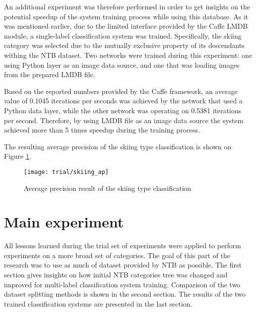     An additional experiment was therefore performed in order to get insights on the potential speedup of the system training process while using this database. As it was mentioned earlier, due to the limited interface provided by the Caffe LMDB module, a single-label classification system was trained. Specifically, the skiing category was selected due to the mutually exclusive property of its descendants withing the NTB dataset. Two networks were trained during this experiment: one using Python layer as an image data source, and one that was loading images from the prepared LMDB file.
    
    Based on the reported numbers provided by the Caffe framework, an average value of 0.1045 iterations per seconds was achieved by the network that used a Python data layer, while the other network was operating on 0.5381 iterations per second. Therefore, by using LMDB file as an image data source the system achieved more than 5 times speedup during the training process. 
    
    The resulting average precision of the skiing type classification is shown on Figure \ref{fig:trial-skiing-ap}.
    
    \begin{figure}[H]
        \centering
        \texttt{[image: trial/skiing\_ap]}
        \caption[Trial experiment. Average precision result of the skiing type classification]{Average precision result of the skiing type classification}
        \label{fig:trial-skiing-ap}
    \end{figure}
    

\section{Main experiment}
All lessons learned during the trial set of experiments were applied to perform experiments on a more broad set of categories. The goal of this part of the research was to use as much of dataset provided by NTB as possible. The first section gives insights on how initial NTB categories tree was changed and improved for multi-label classification system training. Comparison of the two dataset splitting methods is shown in the second section. The results of the two trained classification systems are presented in the last section.

